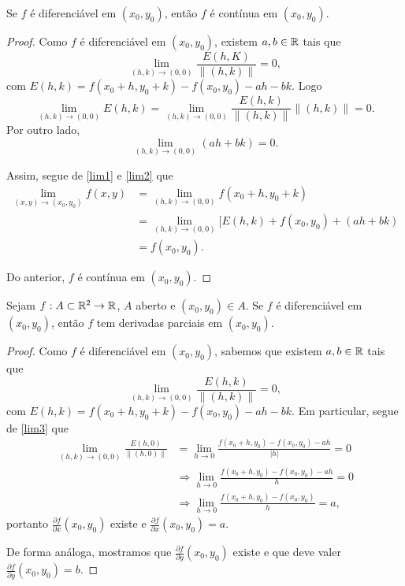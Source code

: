\begin{theorem}\label{DiferenciabilidadeImplicaContinuidade}
    Se \(f\) é diferenciável em \((x_0,y_0)\), então \(f\) é contínua em \((x_0,y_0)\).
\end{theorem}

\begin{proof}
    Como \(f\) é diferenciável em \((x_0,y_0)\), existem \(a,b\in\mathbb{R}\) tais que \[\lim_{(h,k)\to(0,0)} \frac{E(h,K)}{\|(h,k)\|} = 0,\] com \(E(h,k) = f(x_0 + h,y_0 + k) - f(x_0,y_0) - ah - bk.\) Logo
        \begin{equation}\tag{*}\label{lim1}
            \lim_{(h,k)\to(0,0)} E(h,k) = \lim_{(h,k)\to(0,0)} \frac{E(h,k)}{\|(h,k)\|} \|(h,k)\| = 0.
        \end{equation}
    Por outro lado,
        \begin{equation}\tag{**}\label{lim2}
            \lim_{(h,k)\to(0,0)} (ah + bk) = 0.
        \end{equation}

    Assim, segue de \eqref{lim1} e \eqref{lim2} que
        \begin{align*}
            \lim_{(x,y)\to(x_0,y_0)} f(x,y)
            & = \lim_{(h,k)\to(0,0)} f(x_0 + h,y_0+k) \\
            & = \lim_{(h,k)\to(0,0)} [E(h,k) + f(x_0,y_0) + (ah+bk) \\
            & = f(x_0,y_0).
        \end{align*}

    Do anterior, \(f\) é contínua em \((x_0,y_0)\).
\end{proof}

\begin{theorem}\label{DiferenciabilidadeImplicaDerivadasParciais}
    Sejam \(f:A\subset\mathbb{R}^2 \to \mathbb{R}\), \(A\) aberto e \((x_0,y_0)\in A\). Se \(f\) é diferenciável em \((x_0,y_0)\), então \(f\) tem derivadas parciais em \((x_0,y_0)\).
\end{theorem}

\begin{proof}
    Como \(f\) é diferenciável em \((x_0,y_0)\), sabemos que existem \(a,b\in\mathbb{R}\) tais que
    \begin{equation}\tag{*}\label{lim3}
        \lim_{(h,k)\to(0,0)} \frac{E(h,k)}{\|(h,k)\|} = 0,
    \end{equation}
com \(E(h,k) = f(x_0+h,y_0+k)-f(x_0,y_0) -ah - bk.\) Em particular, segue de \eqref{lim3} que
    \begin{align*}
        \lim_{(h,k)\to(0,0)} \frac{E(h,0)}{\|(h,0)\|} 
            & = \lim_{h\to 0} \frac{f(x_0+h,y_0) - f(x_0,y_0) - ah}{|h|} = 0 \\
            & \Rightarrow \lim_{h\to 0} \frac{f(x_0+h,y_0) - f(x_0,y_0) - ah}{h} = 0 \\
            & \Rightarrow \lim_{h\to 0} \frac{f(x_0+h,y_0)-f(x_0,y_0)}{h} = a,
    \end{align*}
portanto \(\frac{\partial f}{\partial x}(x_0,y_0)\) existe e \(\frac{\partial f}{\partial x}(x_0,y_0) = a\).

De forma análoga, mostramos que \(\frac{\partial f}{\partial y}(x_0,y_0)\) existe e que deve valer \(\frac{\partial f}{\partial y}(x_0,y_0) = b\).
\end{proof}


